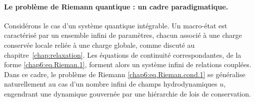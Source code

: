 \paragraph{Le problème de Riemann quantique : un cadre paradigmatique.}
Considérons le cas d’un système quantique intégrable.  
Un macro-état est caractérisé par un ensemble infini de paramètres, chacun associé à une charge conservée locale reliée à une charge globale, comme discuté au chapitre~\ref{chap:relaxation}.  
Les équations de continuité correspondantes, de la forme \eqref{chap6:eq.Rieman.1}, forment alors un système infini de relations couplées.  
Dans ce cadre, le problème de Riemann \eqref{chap6:eq.Rieman.cond.1} se généralise naturellement au cas d’un nombre infini de champs hydrodynamiques $u$, engendrant une dynamique gouvernée par une hiérarchie de lois de conservation.




